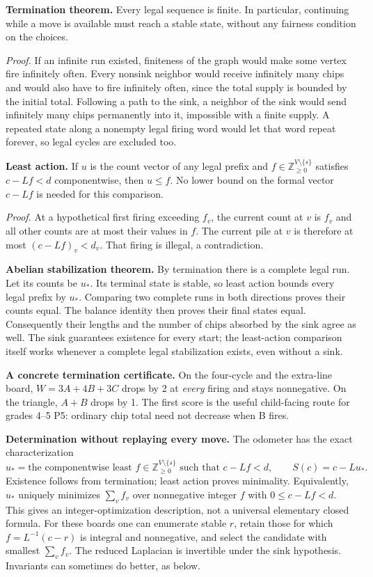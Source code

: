 \textbf{Termination theorem.} Every legal sequence is finite. In particular, continuing while a move is available must reach a stable state, without any fairness condition on the choices.

\emph{Proof.} If an infinite run existed, finiteness of the graph would make some vertex fire infinitely often. Every nonsink neighbor would receive infinitely many chips and would also have to fire infinitely often, since the total supply is bounded by the initial total. Following a path to the sink, a neighbor of the sink would send infinitely many chips permanently into it, impossible with a finite supply. A repeated state along a nonempty legal firing word would let that word repeat forever, so legal cycles are excluded too.

\textbf{Least action.} If $u$ is the count vector of any legal prefix and $f\in\mathbb Z_{\ge0}^{V\setminus\{s\}}$ satisfies $c-Lf<d$ componentwise, then $u\le f$. No lower bound on the formal vector $c-Lf$ is needed for this comparison.

\emph{Proof.} At a hypothetical first firing exceeding $f_v$, the current count at $v$ is $f_v$ and all other counts are at most their values in $f$. The current pile at $v$ is therefore at most $(c-Lf)_v<d_v$. That firing is illegal, a contradiction.

\textbf{Abelian stabilization theorem.} By termination there is a complete legal run. Let its counts be $u_*$. Its terminal state is stable, so least action bounds every legal prefix by $u_*$. Comparing two complete runs in both directions proves their counts equal. The balance identity then proves their final states equal. Consequently their lengths and the number of chips absorbed by the sink agree as well. The sink guarantees existence for every start; the least-action comparison itself works whenever a complete legal stabilization exists, even without a sink.

\textbf{A concrete termination certificate.} On the four-cycle and the extra-line board, $W=3A+4B+3C$ drops by 2 at \emph{every} firing and stays nonnegative. On the triangle, $A+B$ drops by 1. The first score is the useful child-facing route for grades 4--5 P5: ordinary chip total need not decrease when B fires.

\newpage
{}\label{determination}
\textbf{Determination without replaying every move.} The odometer has the exact characterization
\[
u_* = \text{the componentwise least }f\in\mathbb Z_{\ge0}^{V\setminus\{s\}}
       \text{ such that } c-Lf<d,
\qquad S(c)=c-Lu_*.
\]
Existence follows from termination; least action proves minimality. Equivalently, $u_*$ uniquely minimizes $\sum_v f_v$ over nonnegative integer $f$ with $0\le c-Lf<d$. This gives an integer-optimization description, not a universal elementary closed formula. For these boards one can enumerate stable $r$, retain those for which $f=L^{-1}(c-r)$ is integral and nonnegative, and select the candidate with smallest $\sum_v f_v$. The reduced Laplacian is invertible under the sink hypothesis. Invariants can sometimes do better, as below.

